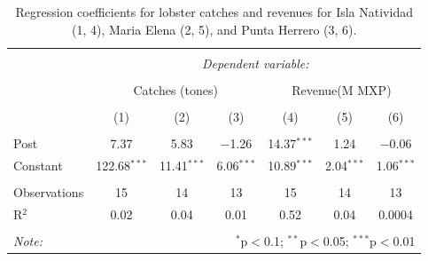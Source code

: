 \documentclass{frontiersSCNS}
\theoremstyle{definition}
\theoremstyle{definition}
\theoremstyle{definition}
\theoremstyle{remark}
\begin{document}
\begin{table}[!htbp] \centering 
  \caption{\label{table:soc_res} Regression coefficients for lobster catches and revenues for Isla Natividad (1, 4), Maria Elena (2, 5), and Punta Herrero (3, 6).} 
  \label{} 
\begin{tabular}{@{\extracolsep{5pt}}lcccccc} 
\\[-1.8ex]\hline 
\hline \\[-1.8ex] 
 & \multicolumn{6}{c}{\textit{Dependent variable:}} \\ 
\cline{2-7} 
\\[-1.8ex] & \multicolumn{3}{c}{Catches (tones)} & \multicolumn{3}{c}{Revenue(M MXP)} \\ 
\\[-1.8ex] & (1) & (2) & (3) & (4) & (5) & (6)\\ 
\hline \\[-1.8ex] 
 Post & 7.37 & 5.83 & $-$1.26 & 14.37$^{***}$ & 1.24 & $-$0.06 \\ 
  Constant & 122.68$^{***}$ & 11.41$^{***}$ & 6.06$^{***}$ & 10.89$^{***}$ & 2.04$^{***}$ & 1.06$^{***}$ \\ 
 \hline \\[-1.8ex] 
Observations & 15 & 14 & 13 & 15 & 14 & 13 \\ 
R$^{2}$ & 0.02 & 0.04 & 0.01 & 0.52 & 0.04 & 0.0004 \\ 
\hline 
\hline \\[-1.8ex] 
\textit{Note:}  & \multicolumn{6}{r}{$^{*}$p$<$0.1; $^{**}$p$<$0.05; $^{***}$p$<$0.01} \\ 
\end{tabular} 
\end{table}
\end{document}
